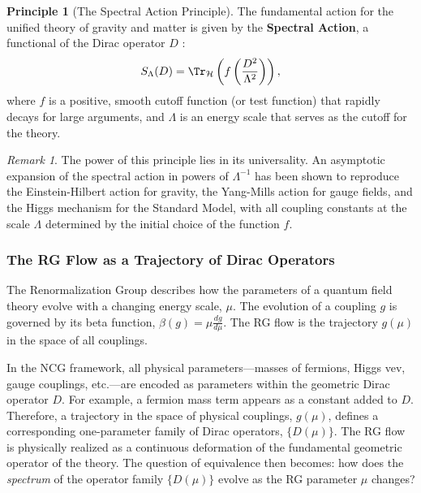 \documentclass[11pt, letterpaper]{report}
\theoremstyle{plain} %
\theoremstyle{definition} %
\newtheorem{principle}{Principle}[chapter]
\theoremstyle{remark} %
\newtheorem{remark}{Remark}[chapter]
\begin{document}
\begin{principle}[The Spectral Action Principle]
\label{principle:spectral_action}
The fundamental action for the unified theory of gravity and matter is given by the \textbf{Spectral Action}, a functional of the Dirac operator $D$ \cite{Chamseddine1997SpectralAction}:
\begin{equation}
    S_{\Lambda}(D) = \Tr_{\mathcal{H}} \left( f\left(\frac{D^2}{\Lambda^2}\right) \right),
    \label{eq:spectral_action}
\end{equation}
where $f$ is a positive, smooth cutoff function (or test function) that rapidly decays for large arguments, and $\Lambda$ is an energy scale that serves as the cutoff for the theory.
\end{principle}
\begin{remark}
The power of this principle lies in its universality. An asymptotic expansion of the spectral action in powers of $\Lambda^{-1}$ has been shown to reproduce the Einstein-Hilbert action for gravity, the Yang-Mills action for gauge fields, and the Higgs mechanism for the Standard Model, with all coupling constants at the scale $\Lambda$ determined by the initial choice of the function $f$.
\end{remark}

\subsubsection{The RG Flow as a Trajectory of Dirac Operators}

The Renormalization Group describes how the parameters of a quantum field theory evolve with a changing energy scale, $\mu$.
The evolution of a coupling $g$ is governed by its beta function, $\beta(g) = \mu \frac{dg}{d\mu}$. The RG flow is the trajectory $g(\mu)$ in the space of all couplings.

In the NCG framework, all physical parameters—masses of fermions, Higgs vev, gauge couplings, etc.—are encoded as parameters within the geometric Dirac operator $D$. For example, a fermion mass term appears as a constant added to $D$. Therefore, a trajectory in the space of physical couplings, $g(\mu)$, defines a corresponding one-parameter family of Dirac operators, $\{D(\mu)\}$. The RG flow is physically realized as a continuous deformation of the fundamental geometric operator of the theory. The question of equivalence then becomes: how does the \textit{spectrum} of the operator family $\{D(\mu)\}$ evolve as the RG parameter $\mu$ changes?
\end{document}
